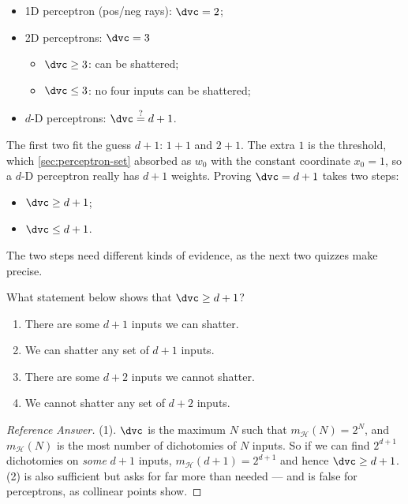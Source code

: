 \begin{itemize}
    \item 1D perceptron (pos/neg rays): \(\dvc = 2\);
    \item 2D perceptrons: \(\dvc = 3\)
    \begin{itemize}
        \item \(\dvc \ge 3\):  can be shattered;
        \item \(\dvc \le 3\):  no four inputs can be shattered;
    \end{itemize}
    \item \(d\)-D perceptrons: \(\dvc \overset{?}{=} d + 1\).
\end{itemize}

The first two fit the guess \(d + 1\): \(1 + 1\) and \(2 + 1\). The extra
\(1\) is the threshold, which \autoref{sec:perceptron-set} absorbed as
\(w_0\) with the constant coordinate \(x_0 = 1\), so a \(d\)-D perceptron really
has \(d + 1\) weights. Proving \(\dvc = d + 1\) takes two steps:

\begin{itemize}
    \item \(\dvc \ge d + 1\);
    \item \(\dvc \le d + 1\).
\end{itemize}

The two steps need different kinds of evidence, as the next two quizzes make
precise.

\begin{exercise}
    What statement below shows that \(\dvc \ge d + 1\)?
    \begin{enumerate}[(1)]
        \item There are some \(d + 1\) inputs we can shatter.
        \item We can shatter any set of \(d + 1\) inputs.
        \item There are some \(d + 2\) inputs we cannot shatter.
        \item We cannot shatter any set of \(d + 2\) inputs.
    \end{enumerate}
\end{exercise}

\begin{proof}[Reference Answer]
    (1). \(\dvc\) is the maximum \(N\) such that \(m_{\mathcal{H}}(N) = 2^N\),
    and \(m_{\mathcal{H}}(N)\) is the most number of dichotomies of \(N\)
    inputs. So if we can find \(2^{d+1}\) dichotomies on \emph{some} \(d + 1\)
    inputs, \(m_{\mathcal{H}}(d + 1) = 2^{d+1}\) and hence \(\dvc \ge d + 1\).
    (2) is also sufficient but asks for far more than needed --- and is false
    for perceptrons, as collinear points show.
\end{proof}

